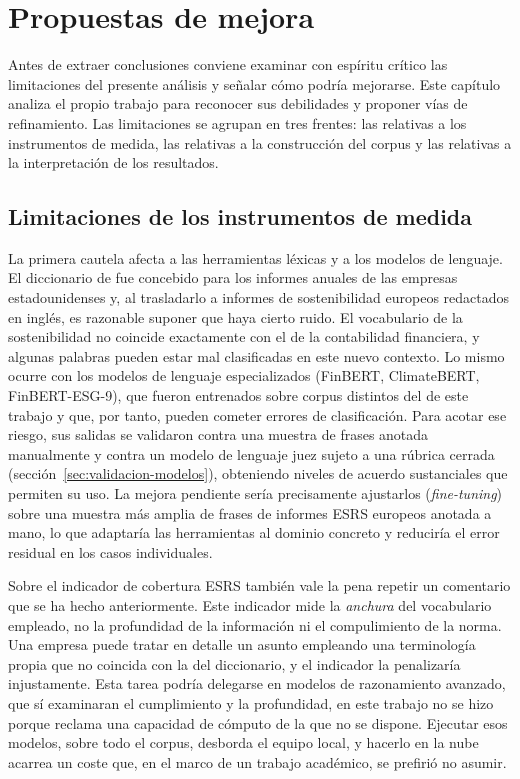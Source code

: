 \chapter{Propuestas de mejora}
\label{cap:propuestas}

Antes de extraer conclusiones conviene examinar con espíritu crítico las
limitaciones del presente análisis y señalar cómo podría mejorarse. Este capítulo 
analiza el propio trabajo para reconocer sus
debilidades y proponer vías de refinamiento. Las limitaciones se agrupan en tres frentes: las
relativas a los instrumentos de medida, las relativas a la construcción del corpus y las
relativas a la interpretación de los resultados.

\section{Limitaciones de los instrumentos de medida}
\label{sec:lim-instrumentos}

La primera cautela afecta a las herramientas léxicas y a los modelos de lenguaje. El diccionario
de \textcite{loughran2011} fue concebido para los
informes anuales de las empresas estadounidenses y, al trasladarlo a informes de sostenibilidad
europeos redactados en inglés, es razonable suponer que haya cierto ruido. El vocabulario
de la sostenibilidad no coincide exactamente con el de la contabilidad financiera, y algunas
palabras pueden estar mal clasificadas en este nuevo contexto. Lo mismo ocurre con los
modelos de lenguaje especializados (FinBERT, ClimateBERT, FinBERT-ESG-9), que fueron entrenados
sobre corpus distintos del de este trabajo y que, por tanto, pueden cometer errores de
clasificación. Para acotar ese riesgo, sus salidas se validaron contra una muestra de frases
anotada manualmente y contra un modelo de lenguaje juez sujeto a una rúbrica cerrada
(sección~\ref{sec:validacion-modelos}), obteniendo niveles de acuerdo sustanciales que permiten su uso. 
La mejora pendiente sería
precisamente ajustarlos (\textit{fine-tuning}) sobre una muestra más amplia de frases de
informes ESRS europeos anotada a mano, lo que adaptaría las herramientas al dominio concreto y
reduciría el error residual en los casos individuales.

Sobre el indicador de cobertura ESRS también vale la pena repetir un comentario que se ha hecho anteriormente. 
Este indicador mide la \textit{anchura} del vocabulario empleado, no la profundidad
de la información ni el compulimiento de la norma. Una empresa puede tratar en detalle un asunto
empleando una terminología propia que no coincida con la del diccionario, y el indicador la
penalizaría injustamente. Esta tarea podría delegarse en modelos de razonamiento avanzado, que
sí examinaran el cumplimiento y la profundidad, en este trabajo no se hizo porque reclama una capacidad de cómputo 
de la que no se dispone. Ejecutar esos modelos, sobre todo el corpus, desborda el equipo local, y hacerlo en la
nube acarrea un coste que, en el marco de un trabajo académico, se prefirió no asumir.

